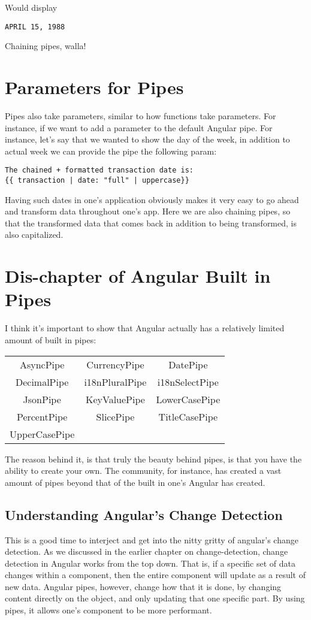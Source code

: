 Would display
\begin{verbatim}
APRIL 15, 1988
\end{verbatim}

Chaining pipes, walla!

\section{Parameters for Pipes}
Pipes also take parameters, similar to how functions take parameters. For
instance, if we want to add a parameter to the default Angular pipe. For
instance, let's say that we wanted to show the day of the week, in addition to
actual week we can provide the pipe the following param:

\begin{lstlisting}
The chained + formatted transaction date is:
{{ transaction | date: "full" | uppercase}}
\end{lstlisting}

Having such dates in one's application obviously makes it very easy to go ahead
and transform data throughout one's app. Here we are also chaining pipes, so
that the transformed data that comes back in addition to being transformed, is
also capitalized.

\section{ Dis-chapter of Angular Built in Pipes }
I think it's important to show that Angular actually has a relatively limited
amount of built in pipes:
\begin{center}
\begin{tabular}{ c c c }
 AsyncPipe & CurrencyPipe & DatePipe \\
 DecimalPipe & i18nPluralPipe & i18nSelectPipe \\
 JsonPipe & KeyValuePipe & LowerCasePipe \\
 PercentPipe & SlicePipe & TitleCasePipe \\
 UpperCasePipe
\end{tabular}
\end{center}

The reason behind it, is that truly the beauty behind pipes, is that you have
the ability to create your own. The community, for instance, has created a vast
amount of pipes beyond that of the built in one's Angular has created.

\subsection{ Understanding Angular's Change Detection }
This is a good time to interject and get into the nitty gritty of angular's
change detection. As we discussed in the earlier chapter on change-detection,
change detection in Angular works from the top down. That is, if a specific set
of data changes within a component, then the entire component will update as a
result of new data. Angular pipes, however, change how that it is done, by
changing content directly on the object, and only updating that one specific
part. By using pipes, it allows one's component to be more performant.

